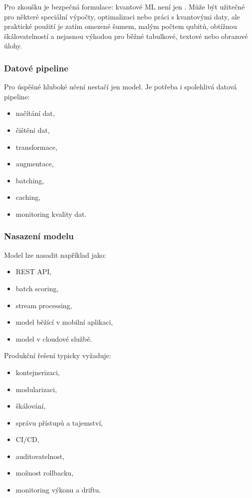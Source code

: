 Pro zkoušku je bezpečná formulace: kvantové ML není jen . Může být užitečné
pro některé speciální výpočty, optimalizaci nebo práci s kvantovými daty, ale praktické použití je zatím
omezené šumem, malým počtem qubitů, obtížnou škálovatelností a nejasnou výhodou pro běžné tabulkové,
textové nebo obrazové úlohy.

\subsubsection{Datové pipeline}

Pro úspěšné hluboké učení nestačí jen model. Je potřeba i spolehlivá datová pipeline:
\begin{itemize}
    \item načítání dat,
    \item čištění dat,
    \item transformace,
    \item augmentace,
    \item batching,
    \item caching,
    \item monitoring kvality dat.
\end{itemize}

\subsubsection{Nasazení modelu}

Model lze nasadit například jako:
\begin{itemize}
    \item REST API,
    \item batch scoring,
    \item stream processing,
    \item model běžící v mobilní aplikaci,
    \item model v cloudové službě.
\end{itemize}

Produkční řešení typicky vyžaduje:
\begin{itemize}
    \item kontejnerizaci,
    \item modularizaci,
    \item škálování,
    \item správu přístupů a tajemství,
    \item CI/CD,
    \item auditovatelnost,
    \item možnost rollbacku,
    \item monitoring výkonu a driftu.
\end{itemize}


